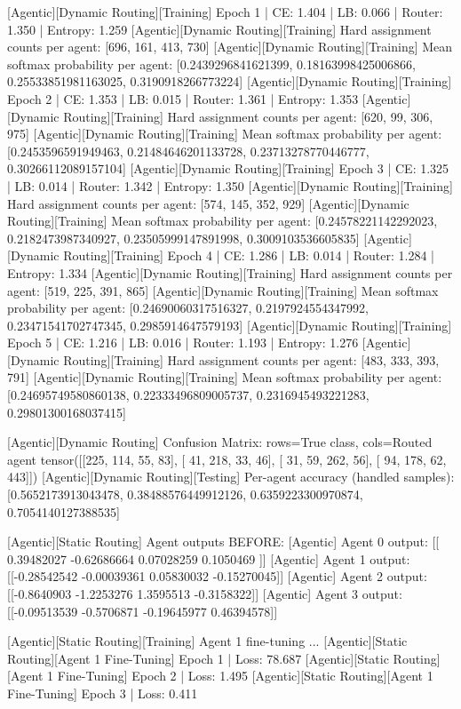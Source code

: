 [Agentic][Dynamic Routing][Training] Epoch 1 | CE: 1.404 | LB: 0.066 | Router: 1.350 | Entropy: 1.259
[Agentic][Dynamic Routing][Training] Hard assignment counts per agent: [696, 161, 413, 730]
[Agentic][Dynamic Routing][Training] Mean softmax probability per agent: [0.2439296841621399, 0.18163998425006866, 0.25533851981163025, 0.3190918266773224]
[Agentic][Dynamic Routing][Training] Epoch 2 | CE: 1.353 | LB: 0.015 | Router: 1.361 | Entropy: 1.353
[Agentic][Dynamic Routing][Training] Hard assignment counts per agent: [620, 99, 306, 975]
[Agentic][Dynamic Routing][Training] Mean softmax probability per agent: [0.2453596591949463, 0.21484646201133728, 0.23713278770446777, 0.30266112089157104]
[Agentic][Dynamic Routing][Training] Epoch 3 | CE: 1.325 | LB: 0.014 | Router: 1.342 | Entropy: 1.350
[Agentic][Dynamic Routing][Training] Hard assignment counts per agent: [574, 145, 352, 929]
[Agentic][Dynamic Routing][Training] Mean softmax probability per agent: [0.24578221142292023, 0.2182473987340927, 0.23505999147891998, 0.3009103536605835]
[Agentic][Dynamic Routing][Training] Epoch 4 | CE: 1.286 | LB: 0.014 | Router: 1.284 | Entropy: 1.334
[Agentic][Dynamic Routing][Training] Hard assignment counts per agent: [519, 225, 391, 865]
[Agentic][Dynamic Routing][Training] Mean softmax probability per agent: [0.24690060317516327, 0.2197924554347992, 0.23471541702747345, 0.2985914647579193]
[Agentic][Dynamic Routing][Training] Epoch 5 | CE: 1.216 | LB: 0.016 | Router: 1.193 | Entropy: 1.276
[Agentic][Dynamic Routing][Training] Hard assignment counts per agent: [483, 333, 393, 791]
[Agentic][Dynamic Routing][Training] Mean softmax probability per agent: [0.24695749580860138, 0.22333496809005737, 0.2316945493221283, 0.29801300168037415]

[Agentic][Dynamic Routing] Confusion Matrix: rows=True class, cols=Routed agent
tensor([[225, 114,  55,  83],
[ 41, 218,  33,  46],
[ 31,  59, 262,  56],
[ 94, 178,  62, 443]])
[Agentic][Dynamic Routing][Testing] Per-agent accuracy (handled samples): [0.5652173913043478, 0.38488576449912126, 0.6359223300970874, 0.7054140127388535]

[Agentic][Static Routing] Agent outputs BEFORE:
[Agentic] Agent 0 output: [[ 0.39482027 -0.62686664  0.07028259  0.1050469 ]]
[Agentic] Agent 1 output: [[-0.28542542 -0.00039361  0.05830032 -0.15270045]]
[Agentic] Agent 2 output: [[-0.8640903 -1.2253276  1.3595513 -0.3158322]]
[Agentic] Agent 3 output: [[-0.09513539 -0.5706871  -0.19645977  0.46394578]]

[Agentic][Static Routing][Training] Agent 1 fine-tuning ...
[Agentic][Static Routing][Agent 1 Fine-Tuning] Epoch 1 | Loss: 78.687
[Agentic][Static Routing][Agent 1 Fine-Tuning] Epoch 2 | Loss: 1.495
[Agentic][Static Routing][Agent 1 Fine-Tuning] Epoch 3 | Loss: 0.411

